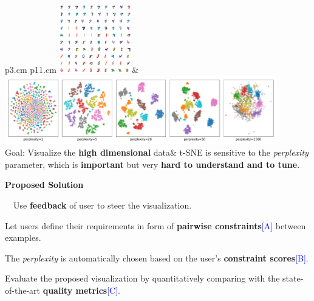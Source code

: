 \documentclass[portrait,final,a0paper]{nadiposter}
\newcommand{\compresslist}{%
\setlength{\itemsep}{1pt}%
\setlength{\parskip}{0pt}%
\setlength{\parsep}{0pt}%
\setlength{\leftmargin}{0pt}%
}
\begin{document}
\begin{poster}
{\begin{minipage}{0.63\linewidth}
    \begin{tabular}{p{3.cm} p{11.cm}}
        \includegraphics[height=8em]{images/mnist_raw200.pdf}&
        \includegraphics[height=8em]{images/MNIST-SMALL_examples.pdf}\\
        Goal: Visualize the \scriptsize{\textbf{high dimensional} data}&
        t-SNE is sensitive to the \emph{perplexity} parameter, which is \textbf{important} but very \textbf{hard to understand and to tune}.\\
    \end{tabular}
\end{minipage}
\begin{minipage}{0.33\linewidth}
    \begin{center} \Large{\textbf{Proposed Solution}}\end{center}
    $\quad$Use \textbf{feedback} of user to steer the visualization.
    
    \begin{itemize}
        \compresslist{
            \item Let users define their requirements in form of \textbf{pairwise constraints}\textcolor{blue}{[A]} between examples.
            \item The \emph{perplexity} is automatically chosen based on the user's \textbf{constraint scores}\textcolor{blue}{[B]}.
            \item Evaluate the proposed visualization by quantitatively comparing with the state-of-the-art \textbf{quality metrics}\textcolor{blue}{[C]}.
        }
    \end{itemize}
\end{minipage}
}


\end{poster}
\end{document}
